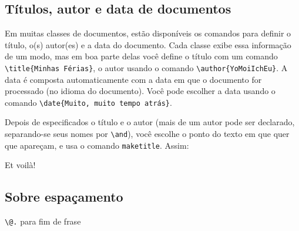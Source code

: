 \subsection{Títulos, autor e data de documentos}

Em muitas classes de documentos, estão disponíveis os comandos para
definir o título, o(s) autor(es) e a data do documento. Cada classe
exibe essa informação de um modo, mas em boa parte delas você define o
título com um comando \verb'\title{Minhas Férias}', o autor usando o
comando \verb'\author{YoMoiIchEu}'. A data é composta automaticamente
com a data em que o documento for processado (no idioma do
documento). Você pode escolher a data usando o comando
\verb'\date{Muito, muito tempo atrás}'.

Depois de especificados o título e o autor (mais de um autor pode ser
declarado, separando-se seus nomes por \verb'\and'), você escolhe o
ponto do texto em que quer que apareçam, e usa o comando
\verb'maketitle'. Assim:

\maketitle

Et voilà!

\subsection{Sobre espaçamento}
\verb!\@.! para fim de frase

